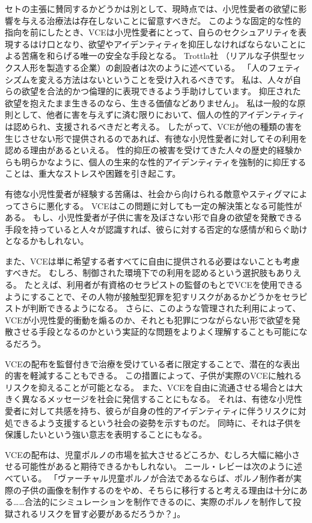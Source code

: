 \documentclass[paper=a4,book,openany]{jlreq} \usepackage{mystyle}
\begin{document}
セトの主張に賛同するかどうかは別として、現時点では、小児性愛者の欲望に影響を与える治療法は存在しないことに留意すべきだ\citep[p.1155]{tiehen18:_virtual_ethic_creep_act}。
このような固定的な性的指向を前にしたとき、VCEは小児性愛者にとって、自らのセクシュアリティを表現するはけ口となり、欲望やアイデンティティを抑圧しなければならないことによる苦痛を和らげる唯一の安全な手段となる。
Trottla社 （リアルな子供型セックス人形を製造する企業）の創設者は次のように述べている。
「人のフェティシズムを変える方法はないということを受け入れるべきです。
私は、人々が自らの欲望を合法的かつ倫理的に表現できるよう手助けしています。
抑圧された欲望を抱えたまま生きるのなら、生きる価値などありません」\citep{morin16:_can_child_dolls_keep_pedop_offen}。
私は一般的な原則として、他者に害を与えずに済む限りにおいて、個人の性的アイデンティティは認められ、支援されるべきだと考える。
したがって、VCEが他の種類の害を生じさせない形で提供されるのであれば、有徳な小児性愛者に対してその利用を認める理由があるといえる。
性的抑圧の被害を受けてきた人々の歴史的経験からも明らかなように、個人の生来的な性的アイデンティティを強制的に抑圧することは、重大なストレスや困難を引き起こす。

有徳な小児性愛者が経験する苦痛は、社会から向けられる敵意やスティグマによってさらに悪化する。
VCEはこの問題に対しても一定の解決策となる可能性がある。
もし、小児性愛者が子供に害を及ぼさない形で自身の欲望を発散できる手段を持っていると人々が認識すれば、彼らに対する否定的な感情が和らぐ助けとなるかもしれない。

また、VCEは単に希望する者すべてに自由に提供される必要はないことも考慮すべきだ。
むしろ、制御された環境下での利用を認めるという選択肢もありえる。
たとえば、利用者が有資格のセラピストの監督のもとでVCEを使用できるようにすることで、その人物が接触型犯罪を犯すリスクがあるかどうかをセラピストが判断できるようになる。
さらに、このような管理された利用によって、VCEが小児性愛的衝動を煽るのか、それとも犯罪につながらない形で欲望を発散させる手段となるのかという実証的な問題をよりよく理解することも可能になるだろう。

VCEの配布を監督付きで治療を受けている者に限定することで、潜在的な表出的害を軽減することもできる。
この措置によって、子供が実際のVCEに触れるリスクを抑えることが可能となる。
また、VCEを自由に流通させる場合とは大きく異なるメッセージを社会に発信することにもなる。
それは、有徳な小児性愛者に対して共感を持ち、彼らが自身の性的アイデンティティに伴うリスクに対処できるよう支援するという社会の姿勢を示すものだ。
同時に、それは子供を保護したいという強い意志を表明することにもなる。

VCEの配布は、児童ポルノの市場を拡大させるどころか、むしろ大幅に縮小させる可能性があると期待できるかもしれない。
ニール・レビーは次のように述べている。
「ヴァーチャル児童ポルノが合法であるならば、ポルノ制作者が実際の子供の画像を制作するのをやめ、そちらに移行すると考える理由は十分にある……合法的にシミュレーションを制作できるのに、実際のポルノを制作して投獄されるリスクを冒す必要があるだろうか？」\citep[p.320]{levy02:_virtual_child_pornog}。
\end{document}

